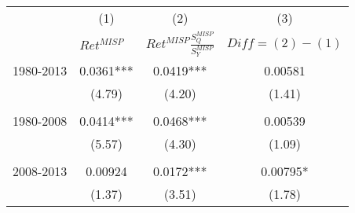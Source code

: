 \begin{tabular}{ccc|c}
\toprule
      & (1)   & (2)   & (3) \\
      & \multicolumn{1}{l}{$Ret^{MISP}$} & \multicolumn{1}{l|}{$Ret^{MISP}\frac{S^{MISP}_{Q}}{S^{MISP}_{Y}}$} & \multicolumn{1}{l}{$Diff = (2) - (1)$} \\
\midrule
1980-2013 & 0.0361*** & 0.0419*** & 0.00581 \\
      & (4.79) & (4.20) & (1.41) \\
      &       &       &  \\
1980-2008 & 0.0414*** & 0.0468*** & 0.00539 \\
      & (5.57) & (4.30) & (1.09) \\
      &       &       &  \\
2008-2013 & 0.00924 & 0.0172*** & 0.00795* \\
      & (1.37) & (3.51) & (1.78) \\
\bottomrule
\end{tabular}%
